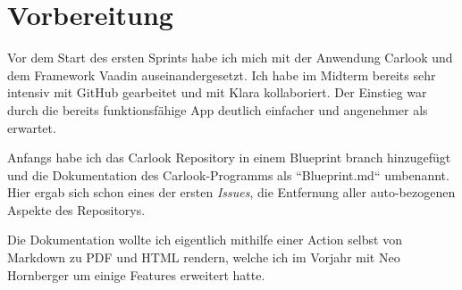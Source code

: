 \section{Vorbereitung}\label{sec:vorarbeiten}
Vor dem Start des ersten Sprints habe ich mich
mit der Anwendung Carlook und dem Framework Vaadin auseinandergesetzt.
Ich habe im Midterm bereits sehr intensiv mit GitHub gearbeitet und mit Klara kollaboriert.
Der Einstieg war durch die bereits funktionsfähige App deutlich einfacher und angenehmer als erwartet.

Anfangs habe ich das Carlook Repository in einem Blueprint branch hinzugefügt und die Dokumentation
des Carlook-Programms als ``Blueprint.md`` umbenannt.
Hier ergab sich schon eines der ersten \emph{Issues}, die Entfernung aller auto-bezogenen Aspekte
des Repositorys.

Die Dokumentation wollte ich eigentlich mithilfe einer Action selbst von Markdown zu PDF und HTML rendern, welche
ich im Vorjahr mit Neo Hornberger um einige Features erweitert hatte.



